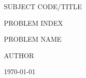 \begin{titlepage}
  \centering
  SUBJECT CODE/TITLE \par\vspace{2cm}
  {\large PROBLEM INDEX} \par\vspace{1cm}
  {\Large PROBLEM NAME} \par\vspace{1cm}
  AUTHOR \par\vspace{2cm} \par\vfill
  \today
\end{titlepage}
